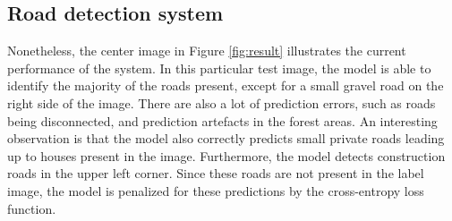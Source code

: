 \subsection{Road detection system}
\label{sec:results_road_detection_system}
Nonetheless, the center image in Figure \ref{fig:result} illustrates the current performance of the system. In this particular test image, the model is able to identify the majority of the roads present, except for a small gravel road on the right side of the image. There are also a lot of prediction errors, such as roads being disconnected, and prediction artefacts in the forest areas. An interesting observation is that the model also correctly predicts small private roads leading up to houses present in the image. Furthermore, the model detects construction roads in the upper left corner. Since these roads are not present in the label image, the model is penalized for these predictions by the cross-entropy loss function.\\

